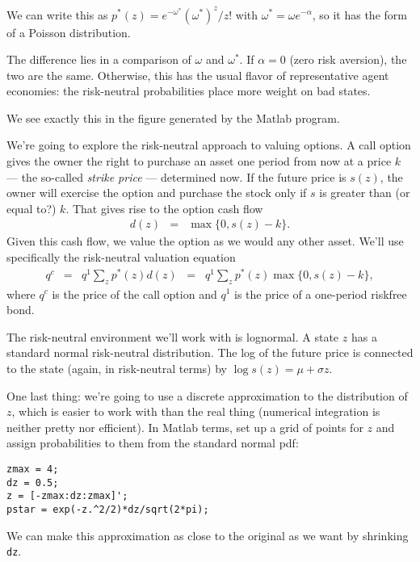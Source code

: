 \documentclass[11pt]{exam}
\begin{document}
\begin{questions}
\begin{solution}
\begin{parts}
\item We can write this as
$ p^*(z) = e^{-\omega^*} (\omega^*)^z /z! $
with $ \omega^* = \omega e^{-\alpha} $, so it has the form of a Poisson distribution.

\item The difference lies in a comparison of $\omega$ and $\omega^*$.
If $\alpha = 0$ (zero risk aversion), the two are the same.
Otherwise, this has the usual flavor of representative agent economies:
the risk-neutral probabilities place more weight on bad states.

\item We see exactly this in the figure generated by the Matlab program.
\end{parts}
\end{solution}


We're going to explore the risk-neutral approach to valuing options.
A call option gives the owner the right to purchase an asset one period from now
at a price $k$ --- the so-called {\it strike price\/} --- determined now.
If the future price is $s(z)$, the owner will {exercise}
the option and purchase the stock only if $s$ is greater than (or equal to?) $k$.
That gives rise to the option cash flow
\begin{eqnarray*}
        d(z) &=&  \max \{0, s(z) - k \} .
\end{eqnarray*}
Given this cash flow, we value the option as we would any other asset.
We'll use specifically the risk-neutral valuation equation
\begin{eqnarray*}
        q^c &=&  q^1 \sum_z p^*(z) d(z)
                \;\;=\;\; q^1 \sum_z p^*(z)  \max \{0, s(z) - k \} ,
\end{eqnarray*}
where $q^c$ is the price of the call option and $q^1$ is the price
of a one-period riskfree bond.

The risk-neutral environment we'll work with is lognormal.
A state $z$ has a standard normal risk-neutral distribution.
The log of the future price is connected to the state (again, in risk-neutral terms)
by $ \log s(z) = \mu + \sigma z $.

One last thing:
we're going to use a discrete approximation to the distribution of $z$,
which is easier to work with than the real thing
(numerical integration is neither pretty nor efficient).
In Matlab terms, set up a grid of points for $z$ and assign probabilities
to them from the standard normal pdf:
\begin{verbatim}
zmax = 4;
dz = 0.5;
z = [-zmax:dz:zmax]';
pstar = exp(-z.^2/2)*dz/sqrt(2*pi);
\end{verbatim}
We can make this approximation as close to the original as we want
by shrinking {\tt dz}.


\end{questions}
\end{document}
